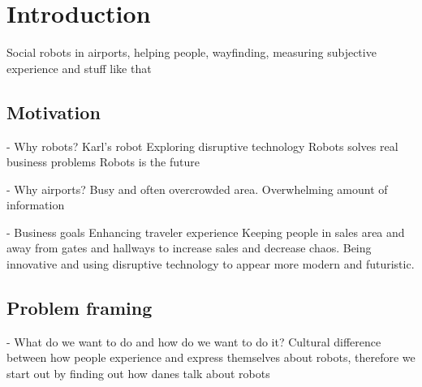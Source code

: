 \section{Introduction}
\label{Introduction}

Social robots in airports, helping people, wayfinding, measuring subjective experience and stuff like that

\subsection{Motivation}
- Why robots?
Karl’s robot
Exploring disruptive technology
Robots solves real business problems
Robots is the future

- Why airports?
Busy and often overcrowded area. Overwhelming amount of information

- Business goals
Enhancing traveler experience
Keeping people in sales area and away from gates and hallways to increase sales and decrease chaos.
Being innovative and using disruptive technology to appear more modern and futuristic.

\subsection{Problem framing}
- What do we want to do and how do we want to do it?
Cultural difference between how people experience and express themselves about robots, therefore we start out by finding out how danes talk about robots
